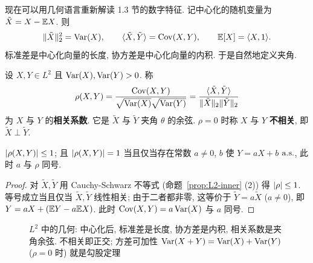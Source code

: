 现在可以用几何语言重新解读 1.3 节的数字特征. 记中心化的随机变量为 $\tilde X=X-\mathbb{E} X$. 则
\[
\lVert\tilde X\rVert_2^2=\operatorname{Var}(X),\qquad \langle\tilde X,\tilde Y\rangle=\operatorname{Cov}(X,Y),\qquad \mathbb{E}[X]=\langle X,1\rangle.
\]
标准差是中心化向量的长度, 协方差是中心化向量的内积. 于是自然地定义夹角.

\begin{definition}[相关系数]\label{def:correlation}
设 $X,Y\in L^2$ 且 $\operatorname{Var}(X),\operatorname{Var}(Y)>0$. 称
\[
\rho(X,Y)=\frac{\operatorname{Cov}(X,Y)}{\sqrt{\operatorname{Var}(X)}\sqrt{\operatorname{Var}(Y)}}=\frac{\langle\tilde X,\tilde Y\rangle}{\lVert\tilde X\rVert_2\lVert\tilde Y\rVert_2}
\]
为 $X$ 与 $Y$ 的\textbf{相关系数}. 它是 $\tilde X$ 与 $\tilde Y$ 夹角 $\theta$ 的余弦. $\rho=0$ 时称 $X$ 与 $Y$ \textbf{不相关}, 即 $\tilde X\perp\tilde Y$.
\end{definition}

\begin{proposition}\label{prop:correlation}
$\lvert\rho(X,Y)\rvert\le1$; 且 $\lvert\rho(X,Y)\rvert=1$ 当且仅当存在常数 $a\ne0$, $b$ 使 $Y=aX+b$ $\text{a.s.}$, 此时 $a$ 与 $\rho$ 同号.
\end{proposition}

\begin{proof}
对 $\tilde X,\tilde Y$ 用 Cauchy-Schwarz 不等式 (命题~\ref{prop:L2-inner} (2)) 得 $\lvert\rho\rvert\le1$. 等号成立当且仅当 $\tilde X,\tilde Y$ 线性相关; 由于二者都非零, 这等价于 $\tilde Y=a\tilde X$ ($a\ne0$), 即 $Y=aX+(\mathbb{E} Y-a\mathbb{E} X)$. 此时 $\operatorname{Cov}(X,Y)=a\operatorname{Var}(X)$ 与 $a$ 同号.
\end{proof}

\begin{figure}[htbp]
\centering
{}
\caption{$L^2$ 中的几何: 中心化后, 标准差是长度, 协方差是内积, 相关系数是夹角余弦. 不相关即正交; 方差可加性 $\operatorname{Var}(X+Y)=\operatorname{Var}(X)+\operatorname{Var}(Y)$ ($\rho=0$ 时) 就是勾股定理}
\label{fig:correlation-angle}
\end{figure}

